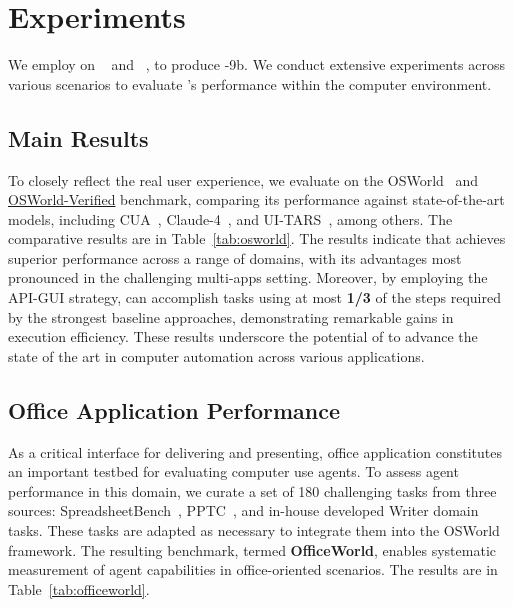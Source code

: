 \section{Experiments}\label{experiment}
We employ \computerrl on \glm~\citep{glm2024chatglm} and \glmv~\citep{hong2025glm}, to produce \model-9b.
We conduct extensive experiments across various scenarios to evaluate \model's performance within the computer environment.



\subsection{Main Results}\label{exp:osworld}
To closely reflect the real user experience, we evaluate \model on the OSWorld~\citep{xie2024osworld} and \href{https://xlang.ai/blog/osworld-verified}{OSWorld-Verified} benchmark, comparing its performance against state-of-the-art models, including CUA~\citep{cua2025}, Claude-4~\citep{claude2}, and UI-TARS~\citep{qin2025ui}, among others. The comparative results are in Table~\ref{tab:osworld}.
The results indicate that \model achieves superior performance across a range of domains, with its advantages most pronounced in the challenging multi-apps setting. Moreover, by employing the API-GUI strategy, \model can accomplish tasks using at most \textbf{1/3} of the steps required by the strongest baseline approaches, demonstrating remarkable gains in execution efficiency. These results underscore the potential of \computerrl to advance the state of the art in computer automation across various applications.

\subsection{Office Application Performance}
As a critical interface for delivering and presenting, office application constitutes an important testbed for evaluating computer use agents. 
To assess agent performance in this domain, we curate a set of 180 challenging tasks from three sources: SpreadsheetBench~\citep{ma2024spreadsheetbench}, PPTC~\citep{guo2023pptc}, and in-house developed Writer domain tasks. These tasks are adapted as necessary to integrate them into the OSWorld framework. The resulting benchmark, termed \textbf{OfficeWorld}, enables systematic measurement of agent capabilities in office-oriented scenarios. The results are in Table~\ref{tab:officeworld}.



